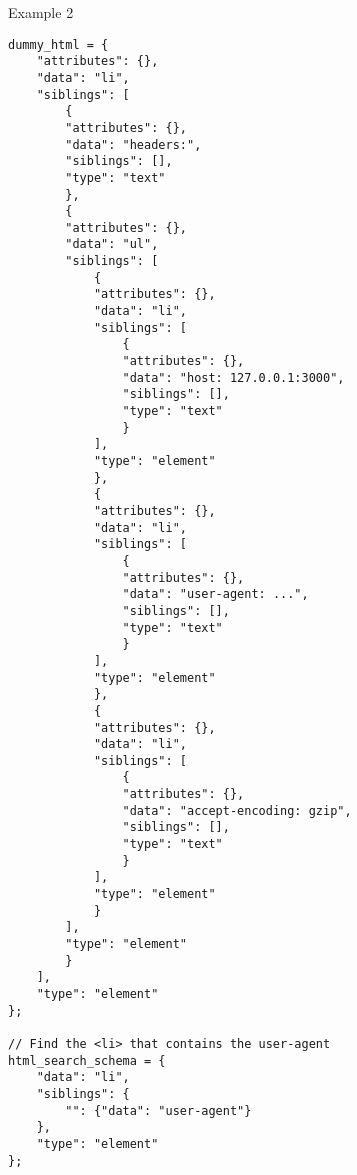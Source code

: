 \begin{center}
    Example 2    
\begin{verbatim}
dummy_html = {
    "attributes": {},
    "data": "li",
    "siblings": [
        {
        "attributes": {},
        "data": "headers:",
        "siblings": [],
        "type": "text"
        },
        {
        "attributes": {},
        "data": "ul",
        "siblings": [
            {
            "attributes": {},
            "data": "li",
            "siblings": [
                {
                "attributes": {},
                "data": "host: 127.0.0.1:3000",
                "siblings": [],
                "type": "text"
                }
            ],
            "type": "element"
            },
            {
            "attributes": {},
            "data": "li",
            "siblings": [
                {
                "attributes": {},
                "data": "user-agent: ...",
                "siblings": [],
                "type": "text"
                }
            ],
            "type": "element"
            },
            {
            "attributes": {},
            "data": "li",
            "siblings": [
                {
                "attributes": {},
                "data": "accept-encoding: gzip",
                "siblings": [],
                "type": "text"
                }
            ],
            "type": "element"
            }
        ],
        "type": "element"
        }
    ],
    "type": "element"
};

// Find the <li> that contains the user-agent
html_search_schema = {
    "data": "li",
    "siblings": {
        "": {"data": "user-agent"}
    },
    "type": "element"
};


\end{verbatim}
\end{center}
